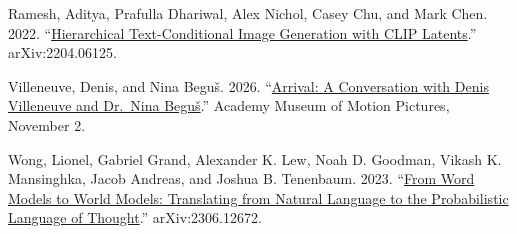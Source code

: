 \documentclass[
  11pt,
  letterpaper,
]{article}
\begin{document}
Ramesh, Aditya, Prafulla Dhariwal, Alex Nichol, Casey Chu, and Mark
Chen. 2022. ``\href{https://arxiv.org/abs/2204.06125}{Hierarchical
Text-Conditional Image Generation with CLIP Latents}.''
arXiv:2204.06125.

Villeneuve, Denis, and Nina Beguš. 2026.
``\href{https://www.youtube.com/watch?v=7QoS5uK52DY}{Arrival: A
Conversation with Denis Villeneuve and Dr.~Nina Beguš}.'' Academy Museum
of Motion Pictures, November 2.

Wong, Lionel, Gabriel Grand, Alexander K. Lew, Noah D. Goodman, Vikash
K. Mansinghka, Jacob Andreas, and Joshua B. Tenenbaum. 2023.
``\href{https://arxiv.org/abs/2306.12672}{From Word Models to World
Models: Translating from Natural Language to the Probabilistic Language
of Thought}.'' arXiv:2306.12672.
\end{document}
